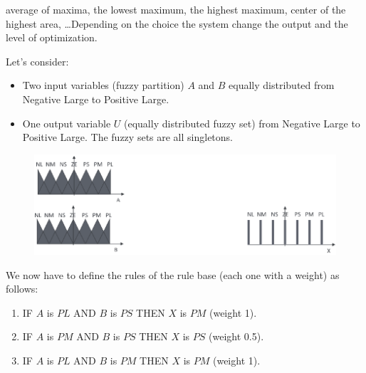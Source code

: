 \documentclass[12pt, a4paper]{report}
\begin{document}
    average of maxima, the lowest maximum, the highest maximum, center of the highest area, \dots Depending on the choice the system change the 
    output and the level of optimization. 
    \begin{example}
        Let's consider:
        \begin{itemize}
            \item Two input variables (fuzzy partition) $A$ and $B$ equally distributed from Negative Large to Positive Large. 
            \item One output variable $U$ (equally distributed fuzzy set) from Negative Large to Positive Large. The fuzzy sets are all singletons.
        \end{itemize} 
        \begin{figure}[H]
            \centering
            \includegraphics[width=0.75\linewidth]{images/rules.png}
        \end{figure}
        We now have to define the rules of the rule base (each one with a weight) as follows: 
        \begin{enumerate}
            \item IF $A$ is $PL$ AND $B$ is $PS$ THEN $X$ is $PM$ (weight 1).
            \item IF $A$ is $PM$ AND $B$ is $PS$ THEN $X$ is $PS$ (weight 0.5).
            \item IF $A$ is $PL$ AND $B$ is $PM$ THEN $X$ is $PM$ (weight 1).
        \end{enumerate}


\end{example}
\end{document}
